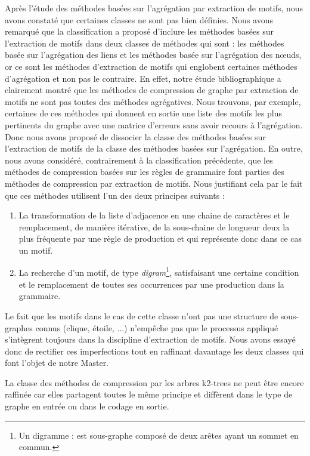Après l'étude des méthodes basées sur l'agrégation par extraction de motifs, nous avons constaté que certaines classes ne sont pas bien définies. Nous avons remarqué que la classification a proposé d'inclure les méthodes basées sur l'extraction de motifs dans deux classes de méthodes qui sont : les méthodes basée sur l'agrégation des liens et les méthodes  basée sur l'agrégation des nœuds, or ce sont les méthodes d'extraction de motifs qui englobent certaines méthodes d'agrégation et non pas le contraire. En effet, notre étude bibliographique a clairement montré que les méthodes de compression de graphe par extraction de motifs ne sont pas toutes des méthodes agrégatives. Nous trouvons, par exemple, certaines de ces méthodes qui donnent en sortie une liste des motifs les plus pertinents du graphe avec une matrice d'erreurs sans avoir recours à l'agrégation. Donc nous avons proposé de dissocier la classe des méthodes basées sur l'extraction de motifs de la classe des méthodes basées sur l'agrégation.
En outre, nous avons considéré, contrairement à la classification précédente, que les méthodes de compression basées sur les règles de grammaire font parties des méthodes de compression par extraction de motifs. Nous justifiant cela par le fait que ces méthodes utilisent l'un des deux principes suivants : 
\begin{enumerate}
\item La transformation de la liste d'adjacence en une chaine de caractères et le remplacement, de manière itérative, de la sous-chaine de longueur deux la plus fréquente par une règle de production et qui représente donc dans ce cas un motif.
\item La recherche d'un motif, de type \textit{digram}\footnote{Un digramme : est sous-graphe composé de deux arêtes ayant un sommet en commun.}, satisfaisant une certaine condition et le remplacement de toutes ses occurrences par une production dans la grammaire. 
\end{enumerate}
Le fait que les motifs dans le cas de cette classe n'ont pas une structure de sous-graphes connus (clique, étoile, ...) n'empêche pas que le processus appliqué s'intègrent toujours dans la discipline d'extraction de motifs. Nous avons essayé donc de rectifier ces imperfections tout en raffinant davantage les deux classes qui font l'objet de notre Master. 

La classe des méthodes de compression par les arbres k2-trees ne peut être encore raffinée car elles partagent toutes le même principe et diffèrent dans le type de graphe en entrée ou dans le codage en sortie.

